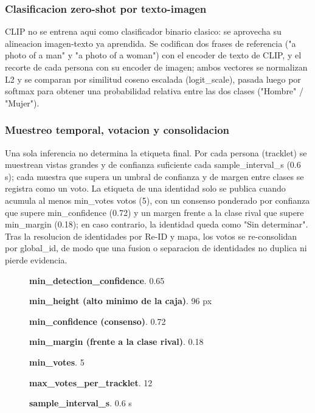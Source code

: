 \documentclass[12pt,letterpaper]{article}
\begin{document}
\subsubsection{Clasificacion zero-shot por texto-imagen}

CLIP no se entrena aqui como clasificador binario clasico: se aprovecha su alineacion imagen-texto ya aprendida. Se codifican dos frases de referencia ("a photo of a man" y "a photo of a woman") con el encoder de texto de CLIP, y el recorte de cada persona con su encoder de imagen; ambos vectores se normalizan L2 y se comparan por similitud coseno escalada (logit\_scale), pasada luego por softmax para obtener una probabilidad relativa entre las dos clases ("Hombre" / "Mujer").


\subsubsection{Muestreo temporal, votacion y consolidacion}

Una sola inferencia no determina la etiqueta final. Por cada persona (tracklet) se muestrean vistas grandes y de confianza suficiente cada sample\_interval\_s (0.6 s); cada muestra que supera un umbral de confianza y de margen entre clases se registra como un voto. La etiqueta de una identidad solo se publica cuando acumula al menos min\_votes votos (5), con un consenso ponderado por confianza que supere min\_confidence (0.72) y un margen frente a la clase rival que supere min\_margin (0.18); en caso contrario, la identidad queda como "Sin determinar". Tras la resolucion de identidades por Re-ID y mapa, los votos se re-consolidan por global\_id, de modo que una fusion o separacion de identidades no duplica ni pierde evidencia.


\begin{description}

\item[] \textbf{min\_detection\_confidence}. 0.65

\item[] \textbf{min\_height (alto minimo de la caja)}. 96 px

\item[] \textbf{min\_confidence (consenso)}. 0.72

\item[] \textbf{min\_margin (frente a la clase rival)}. 0.18

\item[] \textbf{min\_votes}. 5

\item[] \textbf{max\_votes\_per\_tracklet}. 12

\item[] \textbf{sample\_interval\_s}. 0.6 s

\end{description}
\end{document}
